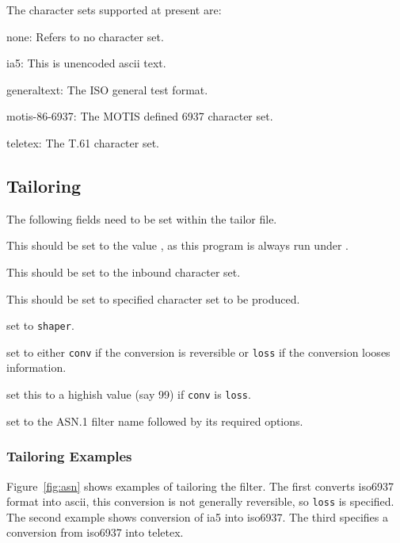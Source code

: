 The character sets supported at present are:
\begin{describe}
\item[none:]	Refers to no character set.
\item[ia5:]	This is unencoded ascii text.
\item[generaltext:]	The ISO general test format.
\item[motis-86-6937:] The MOTIS defined 6937 character set.
\item[teletex:]	The T.61 character set.
\end{describe}

\subsection {Tailoring}

The following fields need to be set within the tailor file.
\begin {describe}
\item[\verb|prog|:] This should be set to the value , as
this program is always run under .
\item[\verb|bptin|:] This should be set to the inbound character set.
\item[\verb|bptout|:] This should be set to specified character set to
be produced.
\item[\verb|type|:] set to \verb|shaper|.
\item[\verb|conv|:] set to either \verb|conv| if the conversion is
reversible or \verb|loss| if the conversion looses information.
\item[\verb|cost|:]  set  this to a highish value (say 99) if
\verb|conv| is \verb|loss|.
\item[\verb|outinfo|:] set to the ASN.1 filter name  followed 
by its required options.
\end {describe}

\subsubsection {Tailoring Examples}

Figure~\ref{fig:asn} shows examples of tailoring the  filter.
The first converts iso6937 format into ascii, this conversion is not
generally reversible, so \verb|loss| is specified. The second example
shows conversion of ia5 into iso6937. The third specifies a conversion
from iso6937 into teletex.


